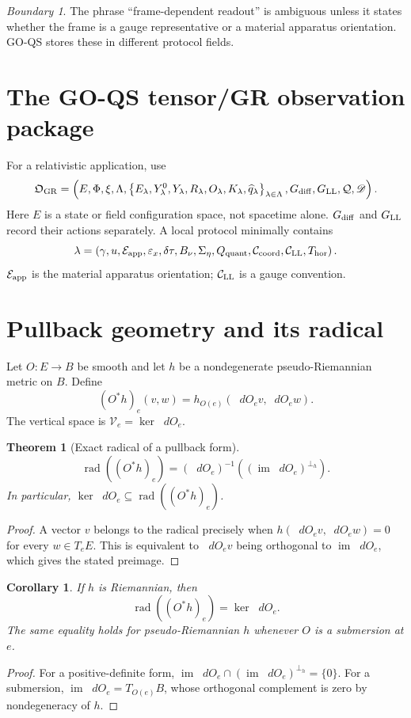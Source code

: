 \documentclass[11pt,a4paper]{article}
\theoremstyle{definition}
\theoremstyle{plain}
\newtheorem{theorem}[definition]{Theorem}
\newtheorem{corollary}[definition]{Corollary}
\theoremstyle{remark}
\newtheorem{warning}[definition]{Boundary}
\newcommand{\Qreg}{\mathcal{Q}}
\newcommand{\Dprof}{\mathscr{D}}
\newcommand{\dd}{\mathop{}\!d}
\newcommand{\set}[1]{\left\{#1\right\}}
\newcommand{\rad}{\operatorname{rad}}
\newcommand{\im}{\operatorname{im}}
\begin{document}
\begin{warning}
The phrase ``frame-dependent readout'' is ambiguous unless it states
whether the frame is a gauge representative or a material apparatus
orientation. GO-QS stores these in different protocol fields.
\end{warning}

\section{The GO-QS tensor/GR observation package}

For a relativistic application, use
\[
\mathfrak O_{\rm GR}=
\left(
E,\Phi,\xi,\Lambda,
\set{E_\lambda,Y_\lambda^0,Y_\lambda,
R_\lambda,O_\lambda,K_\lambda,\widehat q_\lambda}_{\lambda\in\Lambda},
G_{\rm diff},G_{\rm LL},\Qreg,\Dprof
\right).
\]
Here $E$ is a state or field configuration space, not spacetime alone.
$G_{\rm diff}$ and $G_{\rm LL}$ record their actions separately. A local
protocol minimally contains
\[
\lambda=
\left(
\gamma,u,\mathcal E_{\rm app},
\varepsilon_x,\delta\tau,B_\nu,
\Sigma_\eta,Q_{\rm quant},
\mathcal C_{\rm coord},\mathcal C_{\rm LL},
T_{\rm hor}
\right).
\]
$\mathcal E_{\rm app}$ is the material apparatus orientation;
$\mathcal C_{\rm LL}$ is a gauge convention.

\section{Pullback geometry and its radical}

Let $O:E\to B$ be smooth and let $h$ be a nondegenerate
pseudo-Riemannian metric on $B$. Define
\[
(O^*h)_e(v,w)
=h_{O(e)}(\dd O_e v,\dd O_e w).
\]
The vertical space is $\mathcal V_e=\ker\dd O_e$.

\begin{theorem}[Exact radical of a pullback form]
\[
\boxed{
\rad((O^*h)_e)
=(\dd O_e)^{-1}
\left(
(\im\dd O_e)^{\perp_h}
\right).
}
\]
In particular, $\ker\dd O_e\subseteq\rad((O^*h)_e)$.
\end{theorem}
\begin{proof}
A vector $v$ belongs to the radical precisely when
$h(\dd O_ev,\dd O_ew)=0$ for every $w\in T_eE$. This is equivalent to
$\dd O_ev$ being orthogonal to $\im\dd O_e$, which gives the stated
preimage.
\end{proof}

\begin{corollary}
If $h$ is Riemannian, then
\[
\rad((O^*h)_e)=\ker\dd O_e.
\]
The same equality holds for pseudo-Riemannian $h$ whenever $O$ is a
submersion at $e$.
\end{corollary}
\begin{proof}
For a positive-definite form,
$\im\dd O_e\cap(\im\dd O_e)^{\perp_h}=\{0\}$. For a submersion,
$\im\dd O_e=T_{O(e)}B$, whose orthogonal complement is zero by
nondegeneracy of $h$.
\end{proof}
\end{document}
